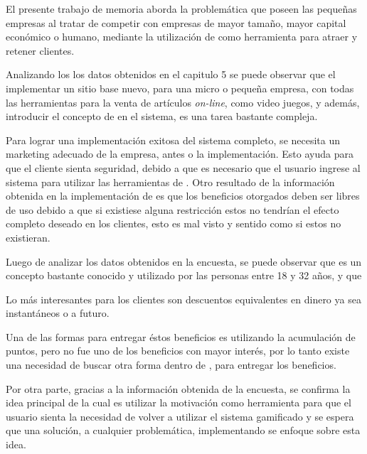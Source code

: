 El presente trabajo de memoria aborda la problemática que poseen las pequeñas
empresas al tratar de competir con empresas de mayor tamaño, mayor capital
económico o humano, mediante la utilización de {\GAM} como herramienta para atraer
y retener clientes.

Analizando los los datos obtenidos en el capitulo 5 se puede observar que el
implementar un sitio base nuevo, para una micro o pequeña empresa, con todas las
herramientas para la venta de artículos \emph{on-line}, como video juegos, y además,
introducir el concepto de {\GAM} en el sistema, es una tarea bastante compleja.

Para lograr una implementación exitosa del sistema completo, se necesita un
marketing adecuado de la empresa, antes o  la implementación.
Esto ayuda para que el cliente sienta seguridad, debido a que es necesario que el
usuario ingrese al sistema para utilizar las herramientas de {\GAM}.
Otro resultado de la información obtenida en la implementación de {\GAM} es que
los beneficios otorgados deben ser libres de uso debido a que si existiese alguna
restricción estos no tendrían el efecto completo deseado en los clientes,
esto es mal visto y sentido como si estos no existieran.

Luego de analizar los datos obtenidos en la encuesta, se puede observar que {\GAM}
es un concepto bastante conocido y utilizado por las personas entre 18 y 32 años,
y que 

Lo más interesantes para los clientes son descuentos equivalentes en dinero ya sea
instantáneos o a futuro.

Una de las formas para entregar éstos beneficios es utilizando la acumulación de
puntos, pero no fue uno de los beneficios con mayor interés, por lo tanto existe
una necesidad de buscar otra forma dentro de {\GAM}, para entregar los beneficios.

Por otra parte, gracias a la información obtenida de la encuesta, se confirma la
idea principal de {\GAM} la cual es utilizar la motivación como herramienta para
que el usuario sienta la necesidad de volver a utilizar el sistema gamificado y
se espera que una solución, a cualquier problemática, implementando {\GAM} se
enfoque sobre esta idea.

